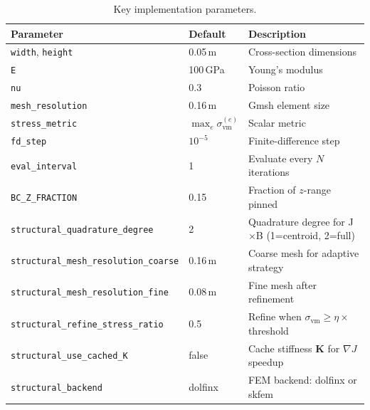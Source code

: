 \begin{table}[t]
  \centering
  \caption{Key implementation parameters.}
  \begin{tabular}{lll}
    \toprule
    Parameter & Default & Description \\
    \midrule
    \texttt{width}, \texttt{height} & 0.05\,m & Cross-section dimensions \\
    \texttt{E} & 100\,GPa & Young's modulus \\
    \texttt{nu} & 0.3 & Poisson ratio \\
    \texttt{mesh\_resolution} & 0.16\,m & Gmsh element size \\
    \texttt{stress\_metric} & $\max_e \sigma_{\text{vm}}^{(e)}$ & Scalar metric \\
    \texttt{fd\_step} & $10^{-5}$ & Finite-difference step \\
    \texttt{eval\_interval} & 1 & Evaluate every $N$ iterations \\
    \texttt{BC\_Z\_FRACTION} & 0.15 & Fraction of $z$-range pinned \\
    \texttt{structural\_quadrature\_degree} & 2 & Quadrature degree for J$\times$B (1=centroid, 2=full) \\
    \texttt{structural\_mesh\_resolution\_coarse} & 0.16\,m & Coarse mesh for adaptive strategy \\
    \texttt{structural\_mesh\_resolution\_fine} & 0.08\,m & Fine mesh after refinement \\
    \texttt{structural\_refine\_stress\_ratio} & 0.5 & Refine when $\sigma_{\text{vm}} \geq \eta \times$ threshold \\
    \texttt{structural\_use\_cached\_K} & false & Cache stiffness $\mathbf{K}$ for $\nabla J$ speedup \\
    \texttt{structural\_backend} & dolfinx & FEM backend: dolfinx or skfem \\
    \bottomrule
  \end{tabular}
  \label{tab:fem_summary}
\end{table}
